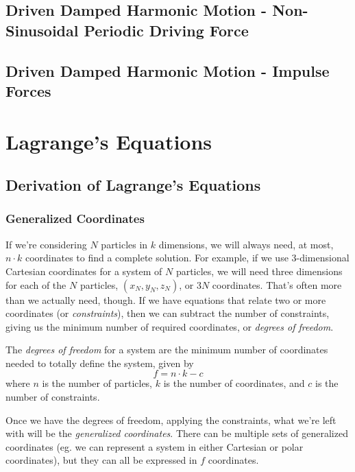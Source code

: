 \documentclass[a4paper]{article}
\begin{document}
\subsection{Driven Damped Harmonic Motion - Non-Sinusoidal Periodic Driving Force}

\subsection{Driven Damped Harmonic Motion - Impulse Forces}

\section{Lagrange's Equations}

\subsection{Derivation of Lagrange's Equations}
\subsubsection{Generalized Coordinates}
If we're considering $N$ particles in $k$ dimensions, we will always need, at
most, $n\cdot k$ coordinates to find a complete solution. For example, if we
use 3-dimensional Cartesian coordinates for a system of $N$ particles, we will
need three dimensions for each of the $N$ particles, $(x_N,y_N,z_N)$, or
$3N$ coordinates. That's often more than we actually need, though. If we have
equations that relate two or more coordinates (or \emph{constraints}), then we
can subtract the number of constraints, giving us the minimum number of
required coordinates, or \emph{degrees of freedom}.
\begin{defi}
	The \emph{degrees of freedom} for a system are the minimum number 
	of coordinates needed to totally define the system, given by
	\[ f = n\cdot k - c \]
	where $n$ is the number of particles, $k$ is the number of coordinates,
	and $c$ is the number of constraints.
\end{defi}
Once we have the degrees of freedom, applying the constraints, what we're left
with will be the \emph{generalized coordinates}. There can be multiple sets of
generalized coordinates (eg. we can represent a system in either Cartesian or
polar coordinates), but they can all be expressed in $f$ coordinates.
\end{document}
